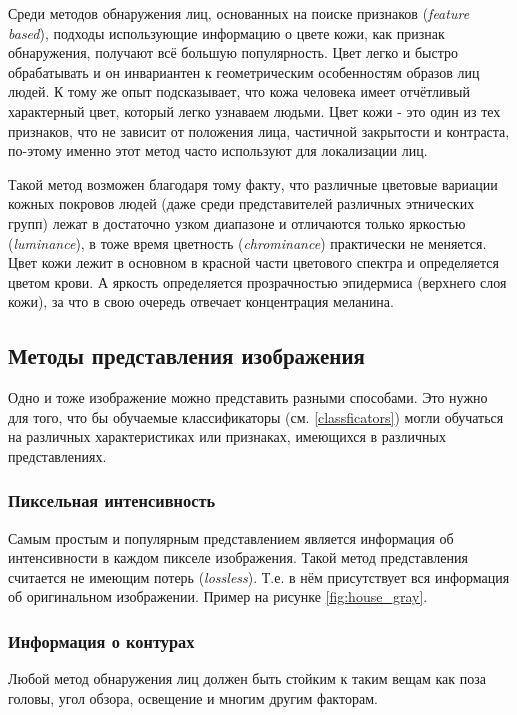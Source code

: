 \documentclass[12pt]{report}
\begin{document}
Среди методов обнаружения лиц, основанных на поиске признаков (\textit{feature based}), подходы использующие 
информацию 
о цвете кожи, как признак обнаружения, получают всё большую популярность. Цвет легко и быстро обрабатывать и он 
инвариантен к геометрическим особенностям образов лиц людей. К тому же опыт подсказывает, что кожа человека 
имеет отчётливый характерный цвет, который легко узнаваем людьми. \citep{vezhnevets2003survey} Цвет кожи - это один 
из тех признаков, что не зависит от положения лица, частичной закрытости и контраста, по-этому именно этот метод 
часто используют для локализации лиц. \citep{ruangyam2009efficient}

Такой метод возможен благодаря тому факту, что различные цветовые вариации кожных покровов людей (даже среди 
представителей различных этнических групп) лежат в достаточно узком диапазоне и отличаются только яркостью (\textit
{luminance}), в тоже время цветность (\textit{chrominance}) практически не меняется. Цвет кожи лежит в основном в 
красной части цветового спектра и определяется цветом крови. А яркость определяется прозрачностью эпидермиса 
(верхнего слоя кожи), за что в свою очередь отвечает концентрация меланина. \citep{xu2006color} %

\subsection{Методы представления изображения}
Одно и тоже изображение можно представить разными способами. Это нужно для того, что бы обучаемые классификаторы 
(см. 
\ref{classficators}) могли обучаться на различных характеристиках или признаках, имеющихся в различных 
представлениях. 

\subsubsection{Пиксельная интенсивность}
Самым простым и популярным представлением является информация об интенсивности в каждом пикселе изображения. Такой 
метод представления считается не имеющим потерь (\textit{lossless}). Т.е. в нём присутствует  вся информация об 
оригинальном изображении. \citep{bojkovic2006face} Пример на рисунке \ref{fig:house_gray}.

\subsubsection{Информация о контурах}
Любой метод обнаружения лиц%
 должен быть стойким к таким вещам 
как поза головы, угол обзора, освещение и многим другим факторам. 
\end{document}
